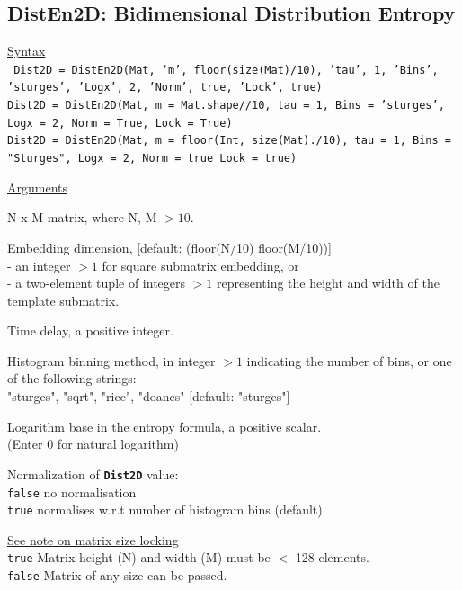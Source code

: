 \documentclass[12pt, a4paper, titlepage, openany]{book}
\begin{document}
\newpage
\subsection{\normalsize DistEn2D: \hspace{15mm} Bidimensional Distribution Entropy}\label{DistEn2D}
\noindent\ul{Syntax} \vspace{6mm} \\ \noindent \texttt{\footnotesize
Dist2D = DistEn2D(Mat, ‘m’, floor(size(Mat)/10), 'tau', 1, 'Bins', 'sturges', 'Logx', 2, 'Norm', true, 'Lock', true)\\
Dist2D = DistEn2D(Mat, m = Mat.shape//10, tau = 1, Bins = 'sturges', Logx = 2, Norm = True, Lock = True)\\
Dist2D = DistEn2D(Mat, m = floor(Int, size(Mat)./10), tau = 1, Bins = "Sturges", Logx = 2, Norm = true Lock = true)}

\noindent \ul{Arguments}
\begin{description}[labelsep=1cm, labelwidth=2cm, nosep,,style=multiline,leftmargin=3cm]\footnotesize
\item[\texttt{Mat}]		N x M matrix,  where N, M $> 10$.
\item[\texttt{m}]		Embedding dimension, [default: (floor(N/10) floor(M/10))]\\
						- an integer $> 1$ for square submatrix embedding, or\\
						- a two-element tuple of integers $> 1$ representing the height and width of the template submatrix.
\item[\texttt{tau}]		Time delay, a positive integer.
\item[\texttt{Bins}]	Histogram binning method, in integer $> 1$ indicating the number of bins, 
						or one of the following strings:\\
   					    "sturges", "sqrt", "rice", "doanes" \hspace{2em} [default: "sturges"]
\item[\texttt{Logx}]	Logarithm base in the entropy formula, a positive scalar.\\
						(Enter 0 for natural logarithm)
\item[\texttt{Norm}]	Normalization of \texttt{\textbf{Dist2D}} value:\\
		  \texttt{false} \hspace{10pt} no normalisation \\
		  \texttt{true} \hspace{15pt} normalises w.r.t number of histogram bins (default)
\item[\texttt{Lock}]	\hyperlink{bidinote}{\ul{See note on matrix size locking}}\\
		  \texttt{true} \hspace{15pt} Matrix height (N) and width (M) must be $<$ 128 elements.\\
		  \texttt{false}\hspace{12pt} Matrix of any size can be passed.\\ 
\end{description}
\end{document}
